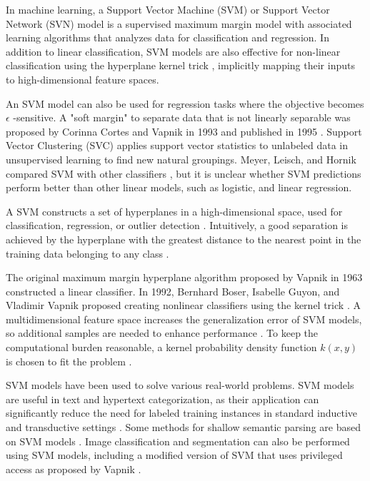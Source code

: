 \documentclass[sn-mathphys-num]{sn-jnl}%
\begin{document}
In machine learning, a Support Vector Machine (SVM) or Support Vector Network (SVN) model is a supervised maximum margin model with associated learning algorithms that analyzes data for classification and regression. In addition to linear classification, SVM models are also effective for non-linear classification using the hyperplane kernel trick \cite{Boser1992}, implicitly mapping their inputs to high-dimensional feature spaces.

An SVM model can also be used for regression tasks where the objective becomes $\epsilon$ -sensitive. A "soft margin" to separate data that is not linearly separable was proposed by Corinna Cortes and Vapnik in 1993 and published in 1995 \cite{Cortes1995}. Support Vector Clustering (SVC) \cite{BenHur2001} applies support vector statistics to unlabeled data in unsupervised learning to find new natural groupings. Meyer, Leisch, and Hornik compared SVM with other classifiers \cite{Meyer2003}, but it is unclear whether SVM predictions perform better than other linear models, such as logistic, and linear regression.

A SVM constructs a set of hyperplanes in a high-dimensional space, used for classification, regression, or outlier detection \cite{scikit-learn2023}. Intuitively, a good separation is achieved by the hyperplane with the greatest distance to the nearest point in the training data belonging to any class \cite{HastieRosset2009}.

The original maximum margin hyperplane algorithm proposed by Vapnik in 1963 constructed a linear classifier. In 1992, Bernhard Boser, Isabelle Guyon, and Vladimir Vapnik proposed creating nonlinear classifiers using the kernel trick \cite{Boser1992, Aizerman1964}. A multidimensional feature space increases the generalization error of SVM models, so additional samples are needed to enhance performance \cite{Jin2012}. To keep the computational burden reasonable, a kernel probability density function $k(x, y)$ is chosen to fit the problem \cite{Press2007}.

SVM models have been used to solve various real-world problems. SVM models are useful in text and hypertext categorization, as their application can significantly reduce the need for labeled training instances in standard inductive and transductive settings \cite{Joachims1998}. Some methods for shallow semantic parsing are based on SVM models \cite{Pradhan2004}. Image classification and segmentation can also be performed using SVM models, including a modified version of SVM that uses privileged access as proposed by Vapnik \cite{Laurent2014, Barghout2015}.
\end{document}
